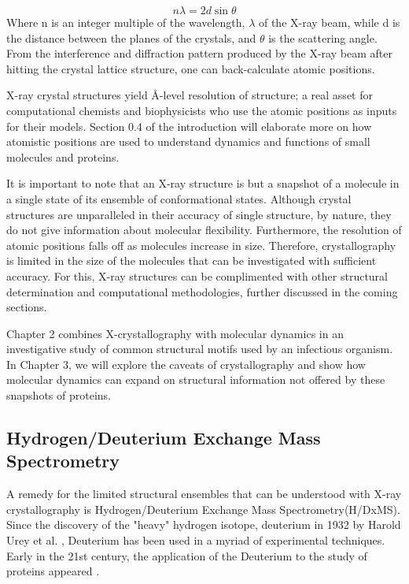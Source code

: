 \documentclass[12pt]{ucsddissertation}
\begin{document}
\begin{dissertationintroduction}
\begin{equation}
n\lambda=2d\sin\theta
\end{equation}
Where n is an integer multiple of the wavelength, $\lambda$ of the X-ray beam, while d is the distance between the planes of the crystals, and $\theta$ is the scattering angle. From the interference and diffraction pattern produced by the X-ray beam after hitting the crystal lattice structure, one can back-calculate atomic positions. 

X-ray crystal structures yield \si{\angstrom}-level resolution of structure; a real asset for computational chemists and biophysicists who use the atomic positions as inputs for their models. Section 0.4 of the introduction will elaborate more on how atomistic positions are used to understand dynamics and functions of small molecules and proteins. 

It is important to note that an X-ray structure is but a snapshot of a molecule in a single state of its ensemble of conformational states. Although crystal structures are unparalleled in their accuracy of single structure, by nature, they do not give information about molecular flexibility.  Furthermore, the resolution of atomic positions falls off as molecules increase in size. Therefore, crystallography is limited in the size of the molecules that can be investigated with sufficient accuracy. For this, X-ray structures can be complimented with other structural determination and computational methodologies, further discussed in the coming sections. 

Chapter 2 combines X-crystallography with molecular dynamics in an investigative study of common structural motifs used by an infectious organism. In Chapter 3, we will explore the caveats of crystallography and show how molecular dynamics can expand on structural information not offered by these snapshots of proteins. 

\subsection{Hydrogen/Deuterium Exchange Mass Spectrometry}
A remedy for the limited structural ensembles that can be understood with X-ray crystallography is Hydrogen/Deuterium Exchange Mass Spectrometry(H/DxMS).  Since the discovery of the "heavy" hydrogen isotope, deuterium in 1932 by Harold Urey et al. \cite{Urey1932}, Deuterium has been used in a myriad of experimental techniques. Early in the 21st century, the application of the Deuterium to the study of proteins appeared \cite{Engen2001}. 


\end{dissertationintroduction}
\end{document}
